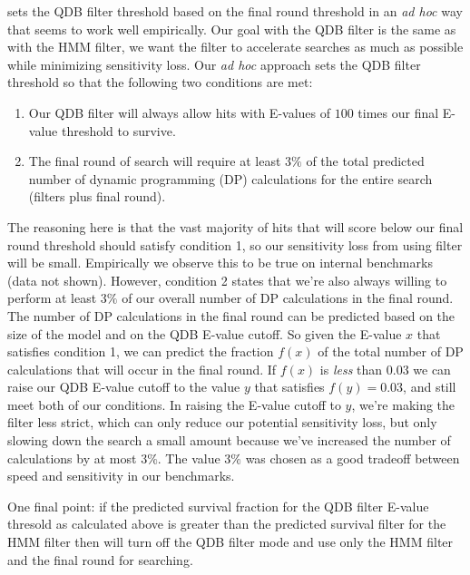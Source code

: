  sets the QDB filter threshold based on the final round
threshold in an \emph{ad hoc} way that seems to work well
empirically. Our goal with the QDB filter is the same as with the HMM
filter, we want the filter to accelerate searches as much as possible
while minimizing sensitivity loss. Our \emph{ad hoc} approach 
sets the QDB filter threshold so that the following two conditions are
met:

\begin{enumerate}
\item
Our QDB filter will always allow hits with E-values of $100$ times our
final E-value threshold to survive. 
\item
The final round of search will require at least $3\%$ of the total
predicted number of dynamic programming (DP) calculations for the
entire search (filters plus final round).
\end{enumerate}

The reasoning here is that the vast majority of hits that will score
below our final round threshold should satisfy condition 1, so
our sensitivity loss from using filter will be small. Empirically we
observe this to be true on internal benchmarks (data not shown).
However, condition 2 states that we're also always willing to perform
at least $3\%$ of our overall number of DP calculations in the final
round. The number of DP calculations in the final round can be
predicted based on the size of the model and on the QDB E-value
cutoff. So given the E-value $x$ that satisfies condition 1, we can
predict the fraction $f(x)$ of the total number of DP calculations that will
occur in the final round. If $f(x)$ is \emph{less} than $0.03$ we can
raise our QDB E-value cutoff to the value $y$ that satisfies $f(y) = 0.03$, and
still meet both of our conditions. In raising the E-value cutoff to
$y$, we're making the filter less strict, which can only reduce our
potential sensitivity loss, but only slowing down the search a small
amount because we've increased the number of calculations by at most
$3\%$.  The value $3\%$ was chosen as a good tradeoff between speed
and sensitivity in our benchmarks. 

One final point: if the predicted survival fraction for the QDB filter
E-value thresold as calculated above is greater than the predicted
survival filter for the HMM filter then  will turn off
the QDB filter mode and use only the HMM filter and the final round
for searching.

